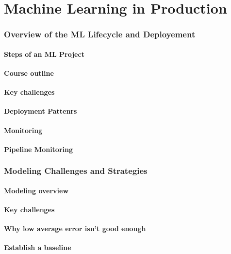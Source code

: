 \part{Machine Learning in Production}

\section{Overview of the ML Lifecycle and Deployement}
\subsection{Steps of an ML Project}
\subsection{Course outline}
\subsection{Key challenges}
\subsection{Deployment Pattenrs}
\subsection{Monitoring}
\subsection{Pipeline Monitoring}

\section{Modeling Challenges and Strategies}
\subsection{Modeling overview}
\subsection{Key challenges}
\subsection{Why low average error isn't good enough}
\subsection{Establish a baseline}
